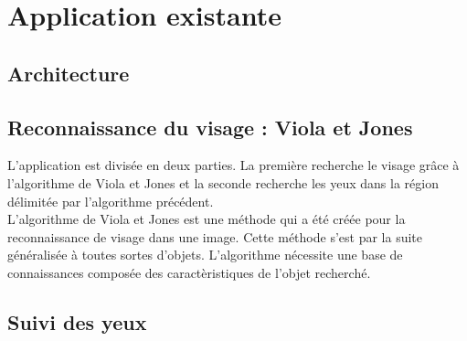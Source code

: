 \section{Application existante}


\subsection{Architecture}

\subsection{Reconnaissance du visage : Viola et Jones}
L'application est divisée en deux parties. La première recherche le visage grâce à
l'algorithme de Viola et Jones et la seconde recherche les yeux dans la région délimitée
par l'algorithme précédent.\\

L'algorithme de Viola et Jones est une méthode qui a été créée pour la reconnaissance de visage dans une 
image. Cette méthode s'est par la suite généralisée à toutes sortes d'objets. L'algorithme nécessite une 
base de connaissances composée des caractèristiques de l'objet recherché.

\subsection{Suivi des yeux}

